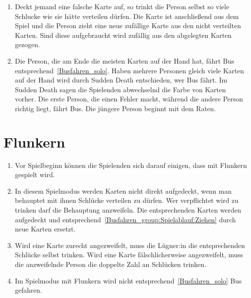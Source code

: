 \begin{enumerate}[label={(\arabic*)}]
    \item\label{Busfahren_group:Spielablauf:Ziehen}
    Deckt jemand eine falsche Karte auf, so trinkt die Person selbst so viele Schlucke wie sie hätte verteilen dürfen.
    Die Karte ist anschließend aus dem Spiel und die Person zieht eine neue zufällige Karte aus den nicht verteilten Karten.
    Sind diese aufgebraucht wird zufällig aus den abgelegten Karten gezogen.

    \item
    Die Person, die am Ende die meisten Karten auf der Hand hat, fährt Bus entsprechend~\ref{Busfahren_solo}.
    Haben mehrere Personen gleich viele Karten auf der Hand wird durch Sudden Death entschieden, wer Bus fährt.
    Im Sudden Death sagen die Spielenden abwechselnd die Farbe von Karten vorher.
    Die erste Person, die einen Fehler macht, während die andere Person richtig liegt, fährt Bus.
    Die jüngere Person beginnt mit dem Raten.
\end{enumerate}

\section{Flunkern}
\begin{enumerate}[label={(\arabic*)}]
\item
Vor Spielbeginn können die Spielenden sich darauf einigen, dass mit Flunkern gespielt wird.

\item
In diesem Spielmodus werden Karten nicht direkt aufgedeckt, wenn man behauptet mit ihnen Schlücke verteilen zu dürfen.
Wer verpflichtet wird zu trinken darf die Behauptung anzweifeln.
Die entsprechenden Karten werden aufgedeckt und entsprechend~\ref{Busfahren_group:Spielablauf:Ziehen} durch neue Karten ersetzt.

\item
Wird eine Karte zurecht angezweifelt, muss die Lügner:in die entsprechenden Schlücke selbst trinken.
Wird eine Karte fälschlicherweise angezweifelt, muss die anzweifelnde Person die doppelte Zahl an Schlücken trinken.

\item
Im Spielmodus mit Flunkern wird nicht entsprechend~\ref{Busfahren_solo} Bus gefahren.
\end{enumerate}
